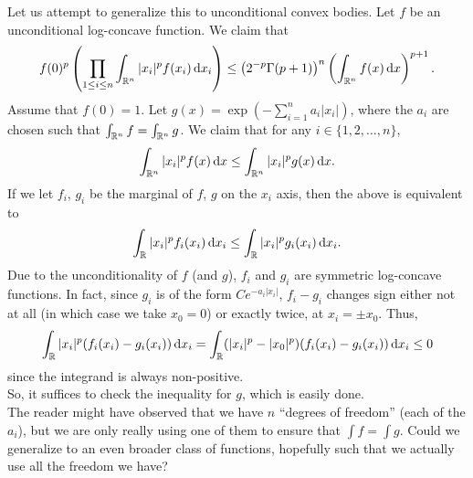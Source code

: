 \documentclass{article}
\begin{document}
	Let us attempt to generalize this to unconditional convex bodies. Let $f$ be an unconditional log-concave function. We claim that
	\begin{equation}
		f(0)^p \left( \prod_{1 \le i \le n} \int_{\Rn} |x_i|^p f(x_i) \dif x_i \right) \le \left( 2^{-p} \Gamma(p+1) \right)^n \left( \int_{\Rn} f(x) \dif x \right)^{p+1}.
	\end{equation}
	Assume that $f(0) = 1$. Let $g(x) = \exp\left(-\sum_{i=1}^n a_i |x_i|\right)$, where the $a_i$ are chosen such that $\int_{\mathbb{R}^n} f = \int_{\mathbb{R}^n} g$. We claim that for any $i \in \{1,2,\ldots,n\}$,
		\[ \int_{\Rn} |x_i|^p f(x) \dif x \leq \int_{\Rn} |x_i|^p g(x) \dif x. \]
	If we let $f_i$, $g_i$ be the marginal of $f$, $g$ on the  $x_i$ axis, then the above is equivalent to
	\[ \int_{\R} |x_i|^p f_i(x_i) \dif x_i \le \int_{\R} |x_i|^p g_i(x_i) \dif x_i. \]
	Due to the unconditionality of $f$ (and $g$), $f_i$ and $g_i$ are symmetric log-concave functions. In fact, since $g_i$ is of the form $Ce^{-a_i |x_i|}$, $f_i - g_i$ changes sign either not at all (in which case we take $x_0 = 0$) or exactly twice, at $x_i = \pm x_0$. Thus,
		\[ \int_{\R} |x_i|^p (f_i(x_i) - g_i(x_i)) \dif x_i = \int_{\R} (|x_i|^p - |x_0|^p) (f_i(x_i) - g_i(x_i)) \dif x_i \le 0 \]
	since the integrand is always non-positive.\\
	So, it suffices to check the inequality for $g$, which is easily done.\\

	The reader might have observed that we have $n$ ``degrees of freedom'' (each of the $a_i$), but we are only really using one of them to ensure that $\int f = \int g$. Could we generalize to an even broader class of functions, hopefully such that we actually use all the freedom we have?



\end{document}
